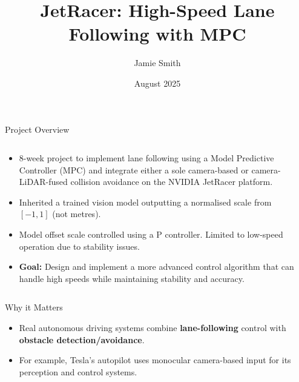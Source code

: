 \documentclass[aspectratio=169,12pt]{beamer}
\title{JetRacer: High-Speed Lane Following with MPC}
\author{Jamie Smith}
\date{August 2025}
\begin{document}
\begin{frame}[t,plain]
  \vspace*{-0.2em}
  \centering
\end{frame}


\begin{frame}[t]{Project Overview}
  \vspace*{-0.3em}
  \begin{columns}[T]
    \begin{column}{0.55\textwidth}
      \begin{itemize}\setlength{\itemsep}{0.35em}
        \item \small 8-week project to implement lane following using a Model Predictive Controller (MPC) and integrate either a sole camera-based or camera-LiDAR-fused collision avoidance on the NVIDIA JetRacer platform.
        \item \small Inherited a trained vision model outputting a normalised scale from \([-1,1]\) (not metres).
        \item \small Model offset scale controlled using a P controller. Limited to low-speed operation due to stability issues.
        \item \small \textbf{Goal:} Design and implement a more advanced control algorithm that can handle high speeds while maintaining stability and accuracy.
      \end{itemize}
    \end{column}
    \begin{column}{0.45\textwidth}
      \centering

    \end{column}
  \end{columns}
\end{frame}

\begin{frame}[t]{Why it Matters}
  \vspace*{-0.3em}
  \begin{itemize}\setlength{\itemsep}{0.45em}
    \item Real autonomous driving systems combine \textbf{lane-following} control with \textbf{obstacle detection/avoidance}.
    \item For example, Tesla's autopilot uses monocular camera-based input for its perception and control systems.
  \end{itemize}
\end{frame}
\end{document}
